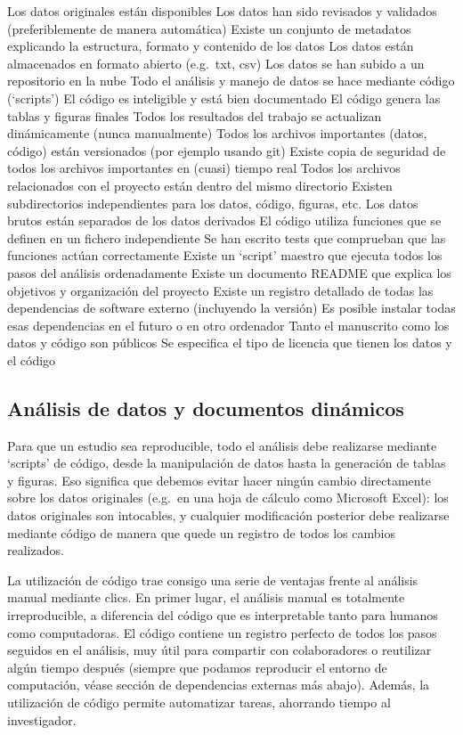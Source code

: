 \documentclass[]{tufte-handout}
\begin{document}
Los datos originales están disponibles Los datos han sido revisados y
validados (preferiblemente de manera automática) Existe un conjunto de
metadatos explicando la estructura, formato y contenido de los datos Los
datos están almacenados en formato abierto (e.g.~txt, csv) Los datos se
han subido a un repositorio en la nube Todo el análisis y manejo de
datos se hace mediante código (`scripts') El código es inteligible y
está bien documentado El código genera las tablas y figuras finales
Todos los resultados del trabajo se actualizan dinámicamente (nunca
manualmente) Todos los archivos importantes (datos, código) están
versionados (por ejemplo usando git) Existe copia de seguridad de todos
los archivos importantes en (cuasi) tiempo real Todos los archivos
relacionados con el proyecto están dentro del mismo directorio Existen
subdirectorios independientes para los datos, código, figuras, etc. Los
datos brutos están separados de los datos derivados El código utiliza
funciones que se definen en un fichero independiente Se han escrito
tests que comprueban que las funciones actúan correctamente Existe un
`script' maestro que ejecuta todos los pasos del análisis ordenadamente
Existe un documento README que explica los objetivos y organización del
proyecto Existe un registro detallado de todas las dependencias de
software externo (incluyendo la versión) Es posible instalar todas esas
dependencias en el futuro o en otro ordenador Tanto el manuscrito como
los datos y código son públicos Se especifica el tipo de licencia que
tienen los datos y el código

\hypertarget{anuxe1lisis-de-datos-y-documentos-dinuxe1micos}{%
\subsection{Análisis de datos y documentos
dinámicos}\label{anuxe1lisis-de-datos-y-documentos-dinuxe1micos}}

Para que un estudio sea reproducible, todo el análisis debe realizarse
mediante `scripts' de código, desde la manipulación de datos hasta la
generación de tablas y figuras. Eso significa que debemos evitar hacer
ningún cambio directamente sobre los datos originales (e.g.~en una hoja
de cálculo como Microsoft Excel): los datos originales son intocables, y
cualquier modificación posterior debe realizarse mediante código de
manera que quede un registro de todos los cambios realizados.

La utilización de código trae consigo una serie de ventajas frente al
análisis manual mediante clics. En primer lugar, el análisis manual es
totalmente irreproducible, a diferencia del código que es interpretable
tanto para humanos como computadoras. El código contiene un registro
perfecto de todos los pasos seguidos en el análisis, muy útil para
compartir con colaboradores o reutilizar algún tiempo después (siempre
que podamos reproducir el entorno de computación, véase sección de
dependencias externas más abajo). Además, la utilización de código
permite automatizar tareas, ahorrando tiempo al investigador.
\end{document}
